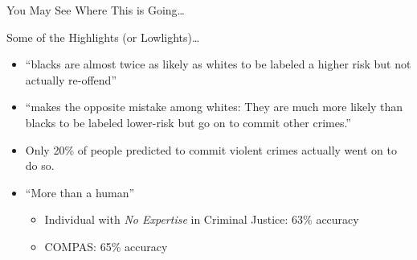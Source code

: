 \documentclass[11pt,dvipsnames,usenames,aspectratio=169]{beamer}  %
\begin{document}
\begin{frame}{You May See Where This is Going\ldots}
  \begin{center}
  \end{center}
\end{frame}

\begin{frame}{Some of the Highlights (or Lowlights)\ldots}
  \noindent

  \begin{itemize}[<+->]
    \setlength{\itemsep}{12pt}
    \item ``blacks are almost twice as likely as whites to be labeled a higher risk but not actually re-offend''

    \item ``makes the opposite mistake among whites: They are much more likely than blacks to be labeled lower-risk but go on to commit other crimes.''

    \item Only 20\% of people predicted to commit violent crimes actually went on to do so.

    \item ``More  than a human''~\citep{Dressel:2018}
      \begin{itemize}[<+->]
        \item Individual with \textit{No Expertise} in Criminal Justice: 63\% accuracy
        \item COMPAS: 65\% accuracy
      \end{itemize}
  \end{itemize}

\end{frame}
\end{document}
